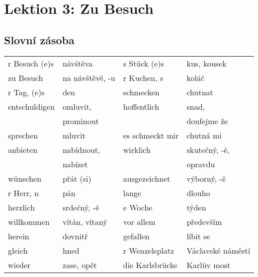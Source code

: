 \setchaptertoc
\chapter{Lektion 3: Zu Besuch}\label{NJ:chap_N1_L3}

  \section*{Slovní zásoba}
    \begin{table}[ht!] %
      \begin{tabular}{llll}  
        \hline 
          r Besuch (e)s &  návštěva        & s Stück (e)s        & kus, kousek           \\
          zu Besuch     & na návštěvě, -u  & r Kuchen, s         & koláč                 \\
          r Tag, (e)s   & den              & schmecken           & chutnat               \\
          entschuldigen & omluvit,         & hoffentlich         & snad,                 \\
                        & prominout        &                     & doufejme že           \\
          sprechen      & mluvit           & es schmeckt mir     & chutná mi             \\
          anbieten      & nabídnout,       & wirklich            & skutečný, -ě,         \\
                        & nabízet          &                     & opravdu               \\
          wünschen      & přát (si)        & ausgezeichnet       & výborný, -ě           \\
          r Herr, n     & pán              & lange               & dlouho                \\
          herzlich      & srdečný, -ě      & e Woche             & týden                 \\
          willkommen    & vítán, vítaný    & vor allem           & především             \\
          herein        & dovnitř          & gefallen            & líbit se              \\
          gleich        & hned             & r Wenzelsplatz      & Václavské náměstí     \\
          wieder        & zase, opět       & die Karlsbrücke     & Karlův most           \\

\end{tabular}
\end{table}
